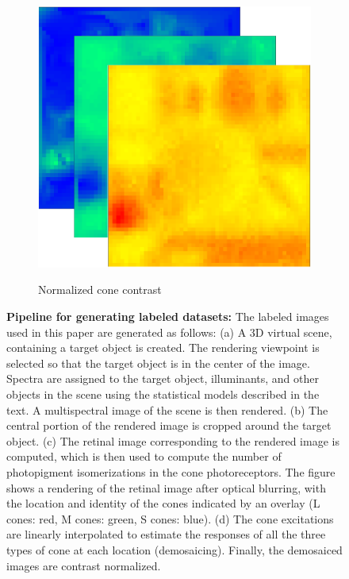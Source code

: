 \documentclass{jov}
\begin{document}
\begin{figure}
\begin{subfigure}[b]{0.19 \textwidth}
        \label{fig:croppedImageWithMosaic}
    \end{subfigure}
    ~
    \begin{subfigure}[b]{0.205 \textwidth}
        \caption{Normalized cone contrast}        
        \includegraphics[width=\textwidth]{../FiguresDraft5/Figure9/Figure9_d.png}
        \label{fig:coneContrast}
    \end{subfigure}
    \label{fig:sceneWithCroppedImage}
    \caption{{\bf Pipeline for generating labeled datasets:}  The labeled images used in this paper are generated as follows: (a) A 3D virtual scene, containing a target object is created. The rendering viewpoint is selected so that the target object is in the center of the image. Spectra are assigned to the target object, illuminants, and other objects in the scene using the statistical models described in the text. A multispectral image of the scene is then rendered. (b) The central portion of the rendered image is cropped around the target object. (c) The retinal image corresponding to the rendered image is computed, which is then used to compute the number of photopigment isomerizations in the cone photoreceptors. The figure shows a rendering of the retinal image after optical blurring, with the location and identity of the cones indicated by an overlay (L cones: red, M cones: green, S cones: blue).  (d) The cone excitations are linearly interpolated to estimate the responses of all the three types of cone at each location (demosaicing). Finally, the demosaiced images are contrast normalized.}
\end{figure}
\end{document}
